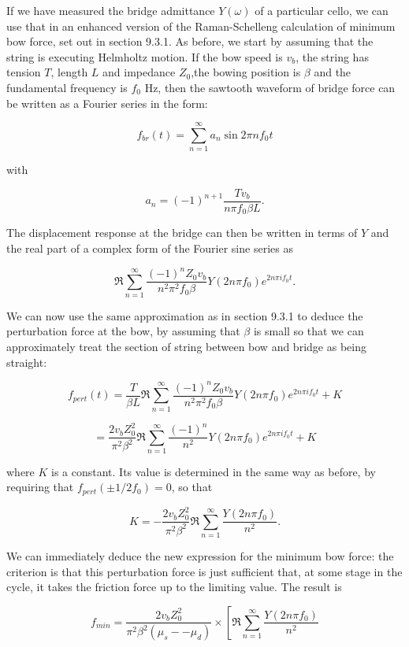   If we have measured the bridge admittance $Y(\omega)$ of a particular cello, 
  we can use that in an enhanced version of the Raman-Schelleng calculation of 
  minimum bow force, set out in section 9.3.1. As before, we start by assuming 
  that the string is executing Helmholtz motion. If the bow speed is $v_b$, the 
  string has tension $T$, length $L$ and impedance $Z_0$,the bowing position is 
  $\beta$ and the fundamental frequency is $f_0$ Hz, then the sawtooth waveform 
  of bridge force can be written as a Fourier series in the form: 

  $$f_{br}(t)=\sum_{n=1}^\infty{a_n \sin 2 \pi n f_0 t} \tag{1}$$ 

  with 

  $$a_n = (-1)^{n+1} \dfrac{Tv_b}{n \pi f_0 \beta L} . \tag{2}$$ 

  The displacement response at the bridge can then be written in terms of $Y$ 
  and the real part of a complex form of the Fourier sine series as 

  $$\Re \sum_{n=1}^\infty{\dfrac{(-1)^n Z_0v_b}{n^2 \pi^2 f_0 \beta} Y(2 n \pi 
  f_0) e^{2n \pi i f_0 t}} . \tag{3}$$ 

  We can now use the same approximation as in section 9.3.1 to deduce the 
  perturbation force at the bow, by assuming that $\beta$ is small so that we 
  can approximately treat the section of string between bow and bridge as being 
  straight: 

  $$f_{pert}(t)=\dfrac{T}{\beta L}\Re \sum_{n=1}^\infty{\dfrac{(-1)^n 
  Z_0v_b}{n^2 \pi^2 f_0 \beta} Y(2 n \pi f_0) e^{2n \pi i f_0 t}} + K$$ 

  $$=\dfrac{2 v_b Z^2_0}{\pi^2 \beta^2}\Re \sum_{n=1}^\infty{\dfrac{(-1)^n 
  }{n^2} Y(2 n \pi f_0) e^{2n \pi i f_0 t}} + K \tag{4}$$ 

  where $K$ is a constant. Its value is determined in the same way as before, 
  by requiring that $f_{pert}(\pm 1/2f_0)=0$, so that 

  $$K=-\dfrac{2 v_b Z^2_0}{\pi^2 \beta^2}\Re \sum_{n=1}^\infty{\dfrac{Y(2 n \pi 
  f_0)}{n^2} } . \tag{5}$$ 

  We can immediately deduce the new expression for the minimum bow force: the 
  criterion is that this perturbation force is just sufficient that, at some 
  stage in the cycle, it takes the friction force up to the limiting value. The 
  result is 

  $$f_{min}=\dfrac{2 v_b Z^2_0}{\pi^2 \beta^2 (\mu_s -- \mu_d)} \times \left[ 
  \Re \sum_{n=1}^\infty{\dfrac{Y(2 n \pi f_0)}{n^2} } \right.$$ 

